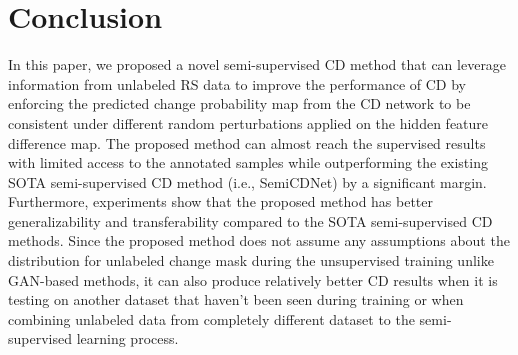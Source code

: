 \documentclass[runningheads]{llncs}
\begin{document}
\begin{figure}[tb]
\begin{floatrow}
\end{floatrow}
\end{figure}

\section{Conclusion}
\vspace{-1mm}
In this paper, we proposed a novel semi-supervised CD method that can leverage information from unlabeled RS data to improve the performance of CD by enforcing the predicted change probability map from the CD network to be consistent under different random perturbations applied on the hidden feature difference map. The proposed method can almost reach the supervised results with limited access to the annotated samples while outperforming the existing SOTA semi-supervised CD method (i.e., SemiCDNet) by a significant margin. Furthermore, experiments show that the proposed method has better generalizability and transferability compared to the SOTA semi-supervised CD methods. Since the proposed method does not assume any assumptions about the distribution for unlabeled change mask during the unsupervised training unlike GAN-based methods, it can also produce relatively better CD results when it is testing on another dataset that haven't been seen during training or when combining unlabeled data from completely different dataset to the semi-supervised learning process.


\clearpage


\end{document}
